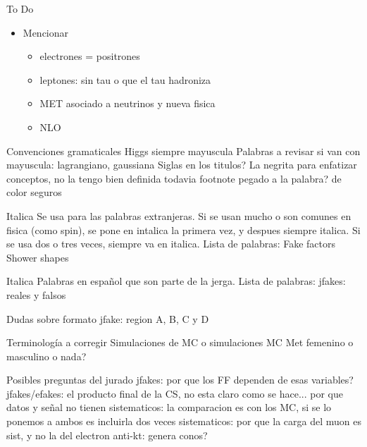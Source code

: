 
{\LARGE To Do}

\begin{itemize}
	\item Mencionar
	\begin{itemize}
		\item electrones = positrones %
		\item leptones: sin tau o que el tau hadroniza
		\item MET asociado a neutrinos y nueva fisica
		\item NLO
	\end{itemize}
\end{itemize}


{Convenciones gramaticales}
Higgs siempre mayuscula
Palabras a revisar si van con mayuscula: lagrangiano, gaussiana
Siglas en los titulos?
La negrita para enfatizar conceptos, no la tengo bien definida todavia
footnote pegado a la palabra? de color seguros

{Italica}
Se usa para las palabras extranjeras. Si se usan mucho o son comunes en fisica (como spin), se pone en intalica la primera vez, y despues siempre italica. Si se usa dos o tres veces, siempre va en italica.
Lista de palabras:
Fake factors
Shower shapes

{Italica}
Palabras en español que son parte de la jerga.
Lista de palabras:
jfakes: reales y falsos

{Dudas sobre formato}
jfake: region A, B, C y D


{Terminología a corregir}
Simulaciones de MC o simulaciones MC
Met femenino o masculino o nada?

{Posibles preguntas del jurado}
jfakes: por que los FF dependen de esas variables?
jfakes/efakes: el producto final de la CS, no esta claro como se hace...
por que datos y señal no tienen sistematicos: la comparacion es con los MC, si se lo ponemos a ambos es incluirla dos veces
sistematicos: por que la carga del muon es sist, y no la del electron
anti-kt: genera conos?



